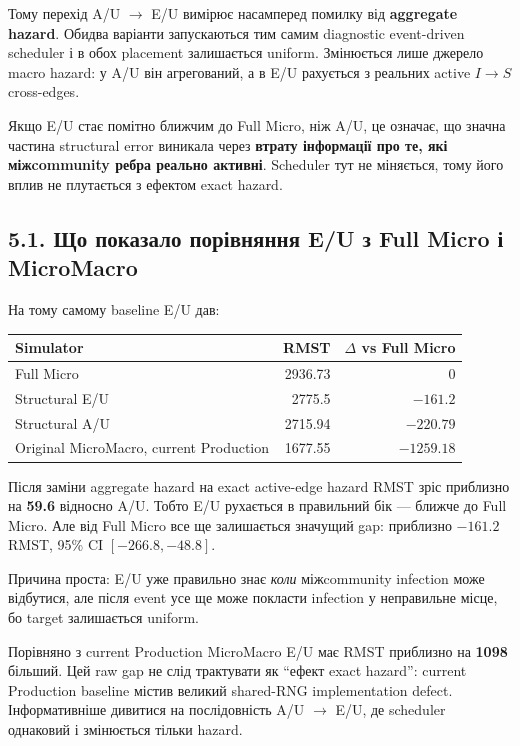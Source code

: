 \documentclass[11pt,a4paper]{article}
\begin{document}
Тому перехід A/U $\to$ E/U вимірює насамперед помилку від \textbf{aggregate hazard}. Обидва варіанти запускаються тим самим diagnostic event-driven scheduler і в обох placement залишається uniform. Змінюється лише джерело macro hazard: у A/U він агрегований, а в E/U рахується з реальних active $I\to S$ cross-edges.

\begin{tcolorbox}[colback=white,colframe=purple,title=Що саме перевіряє E/U?]
Якщо E/U стає помітно ближчим до Full Micro, ніж A/U, це означає, що значна частина structural error виникала через \textbf{втрату інформації про те, які міжcommunity ребра реально активні}. Scheduler тут не міняється, тому його вплив не плутається з ефектом exact hazard.
\end{tcolorbox}

\subsection*{5.1. Що показало порівняння E/U з Full Micro і MicroMacro}

На тому самому baseline E/U дав:

\begin{center}
\begin{tabular}{l r r}
\toprule
\textbf{Simulator} & \textbf{RMST} & \textbf{$\Delta$ vs Full Micro}\\
\midrule
Full Micro & 2936.73 & 0\\
Structural E/U & 2775.5 & $-161.2$\\
Structural A/U & 2715.94 & $-220.79$\\
Original MicroMacro, current Production & 1677.55 & $-1259.18$\\
\bottomrule
\end{tabular}
\end{center}

Після заміни aggregate hazard на exact active-edge hazard RMST зріс приблизно на \textbf{59.6} відносно A/U. Тобто E/U рухається в правильний бік --- ближче до Full Micro. Але від Full Micro все ще залишається значущий gap: приблизно $-161.2$ RMST, 95\% CI $[-266.8,-48.8]$.

Причина проста: E/U уже правильно знає \textit{коли} міжcommunity infection може відбутися, але після event усе ще може покласти infection у неправильне місце, бо target залишається uniform.

Порівняно з current Production MicroMacro E/U має RMST приблизно на \textbf{1098} більший. Цей raw gap не слід трактувати як ``ефект exact hazard'': current Production baseline містив великий shared-RNG implementation defect. Інформативніше дивитися на послідовність A/U $\to$ E/U, де scheduler однаковий і змінюється тільки hazard.
\end{document}
